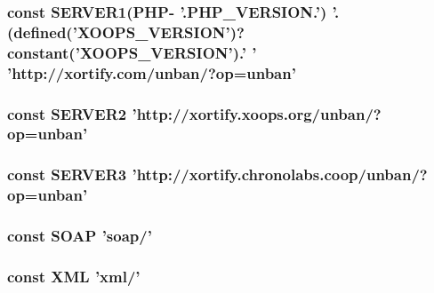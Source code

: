 \hypertarget{serverup_8php_a58e794bee7ddf93b7733e35ac71cf8ed}{
\subsubsection[{S\-E\-R\-V\-E\-R1}]{\setlength{\rightskip}{0pt plus 5cm}const S\-E\-R\-V\-E\-R1(P\-H\-P-\/ '.P\-H\-P\-\_\-\-V\-E\-R\-S\-I\-O\-N.') '.(defined('X\-O\-O\-P\-S\-\_\-\-V\-E\-R\-S\-I\-O\-N')?constant('X\-O\-O\-P\-S\-\_\-\-V\-E\-R\-S\-I\-O\-N').' ' 'http\-://xortify.\-com/unban/?op=unban'}}\label{serverup_8php_a58e794bee7ddf93b7733e35ac71cf8ed}
\hypertarget{serverup_8php_a8a17ba733d7bbbe191983c1998184298}{
\subsubsection[{S\-E\-R\-V\-E\-R2}]{\setlength{\rightskip}{0pt plus 5cm}const S\-E\-R\-V\-E\-R2 'http\-://xortify.\-xoops.\-org/unban/?op=unban'}}\label{serverup_8php_a8a17ba733d7bbbe191983c1998184298}
\hypertarget{serverup_8php_a4bec4584771b978c7de363db5d597cd2}{
\subsubsection[{S\-E\-R\-V\-E\-R3}]{\setlength{\rightskip}{0pt plus 5cm}const S\-E\-R\-V\-E\-R3 'http\-://xortify.\-chronolabs.\-coop/unban/?op=unban'}}\label{serverup_8php_a4bec4584771b978c7de363db5d597cd2}
\hypertarget{serverup_8php_abd77e417d95ee59b739e54a62fe97fbc}{
\subsubsection[{S\-O\-A\-P}]{\setlength{\rightskip}{0pt plus 5cm}const S\-O\-A\-P 'soap/'}}\label{serverup_8php_abd77e417d95ee59b739e54a62fe97fbc}
\hypertarget{serverup_8php_a5f33028773b1db8e11fcd34516dacb28}{
\subsubsection[{X\-M\-L}]{\setlength{\rightskip}{0pt plus 5cm}const X\-M\-L 'xml/'}}\label{serverup_8php_a5f33028773b1db8e11fcd34516dacb28}
